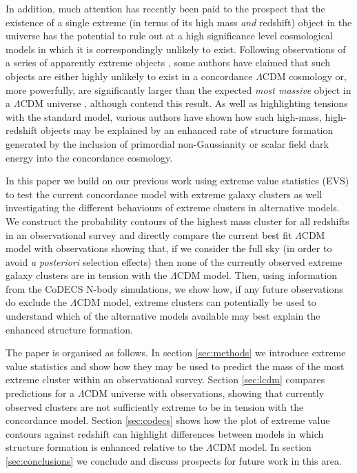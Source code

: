 \documentclass[twocolumn,useAMS,usenatbib,usegraphicx]{mn2e}
\newcommand{\lcdm}{$\Lambda$CDM }
\begin{document}
In addition, much attention has recently been paid to the prospect
that the existence of a single extreme (in terms of its high mass
\emph{and} redshift) object in the universe has the potential to
rule out at a high significance level cosmological models in which
it is correspondingly unlikely to exist. Following observations of a
series of apparently extreme objects \citep{Jee2009a, Brodwin2010,
Foley2011, Marriage2011a, PlanckCollaboration2011, Santos2011}, some
authors have claimed that such objects are either highly unlikely to
exist \citep{Jimenez2009, Holz2010, Cay'on2011, Hoyle2011b} in a
concordance \lcdm cosmology or, more powerfully, are significantly
larger than the expected \emph{most massive} object in a \lcdm
universe \citep {Chongchitnan2011}, although \cite{Waizmann2011a}
contend this result. As well as highlighting tensions with the
standard model, various authors have shown how such high-mass,
high-redshift objects may be explained by an enhanced rate of
structure formation generated by the inclusion of primordial
non-Gaussianity \citep{Enqvist2011, Hoyle2011b, Cay'on2011,
Chongchitnan2011} or scalar field dark energy \citep{Waizmann2011}
into the concordance cosmology.

In this paper we build on our previous work using extreme value
statistics (EVS) \citep{Harrison2011} to test the current
concordance model with extreme galaxy clusters as well investigating
the different behaviours of extreme clusters in alternative models.
We construct the probability contours of the highest mass cluster
for all redshifts in an observational survey and directly compare
the current best fit \lcdm model with observations showing that, if
we consider the full sky (in order to avoid \textit{a posteriori}
selection effects) then none of the currently observed extreme
galaxy clusters are in tension with the \lcdm model. Then, using
information from the CoDECS \citep{Baldi2011a} N-body simulations,
we show how, if any future observations do exclude the \lcdm model,
extreme clusters can potentially be used to understand which of the
alternative models available may best explain the enhanced structure
formation.

The paper is organised as follows. In section \ref{sec:methods} we
introduce extreme value statistics and show how they may be used to
predict the mass of the most extreme cluster within an observational
survey. Section \ref{sec:lcdm} compares predictions for a \lcdm
universe with observations, showing that currently observed clusters
are not sufficiently extreme to be in tension with the concordance
model. Section \ref{sec:codecs} shows how the plot of extreme value
contours against redshift can highlight differences between models
in which structure formation is enhanced relative to the \lcdm
model. In section \ref{sec:conclusions} we conclude and discuss
prospects for future work in this area.
\end{document}
